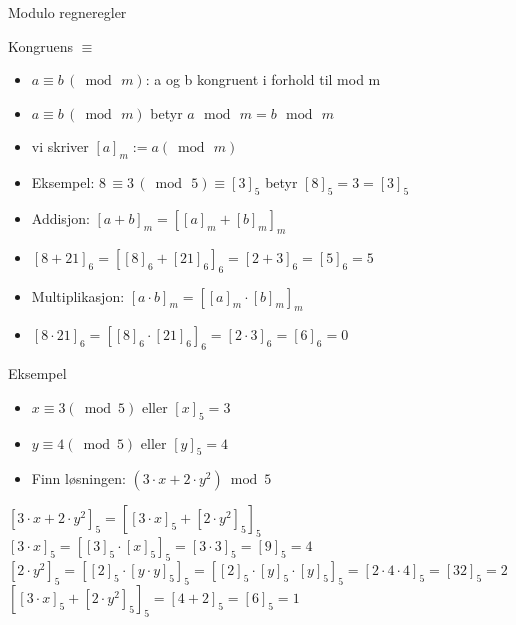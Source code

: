 \begin{frame}{Modulo regneregler}
       \begin{block}{Kongruens $\equiv$}
              \begin{itemize}
                     \item $a \equiv b\, (\bmod \, m)$: a og b kongruent i forhold til mod m
                     \item $a \equiv b\, (\bmod\, m)$ betyr $a\, \bmod\, m=b\, \bmod\, m$
                     \item vi skriver $[a]_m := a (\bmod\, m)$
                     \item Eksempel: $8\, \equiv 3\, (\bmod\, 5) \equiv [3]_5$ betyr $[8]_5=3=[3]_5$ 
              \end{itemize}
       \end{block}
       \pause
       \begin{itemize}[<+->]
              \item Addisjon: $[a+b]_m = [[a]_m + [b]_m]_m$
\item $[8+21]_6 = [[8]_6 + [21]_6]_6 = [2 + 3]_6 = [5]_6 = 5$
\item Multiplikasjon: $[a\cdot b]_m = [[a]_m \cdot [b]_m]_m$
\item $[8 \cdot 21]_6 = [[8]_6 \cdot [21]_6]_6 = [2 \cdot 3]_6 = [6]_6 = 0$
\end{itemize}
\end{frame}

\begin{frame}{}
\begin{exampleblock}{Eksempel}
\begin{itemize}
\item $x \equiv 3(\bmod 5)$ eller $[x]_5=3$
\item $y \equiv 4(\bmod 5)$ eller $[y]_5=4$
\item Finn løsningen: $(3 \cdot x+2 \cdot y^2) \bmod 5$
\end{itemize}
\end{exampleblock}
\pause
\medskip

$[3\cdot x+2\cdot y^2]_5=[[3\cdot x]_5+[2\cdot y^2]_5]_5$\\

$[3\cdot x]_5=[[3]_5\cdot [x]_5]_5=[3\cdot 3]_5=[9]_5=4$\\
$[2\cdot y^2]_5=[[2]_5\cdot [y\cdot y]_5]_5=[[2]_5\cdot [y]_5\cdot[y]_5]_5=[2\cdot 4\cdot 4]_5=[32]_5=2$\\

$[[3\cdot x]_5+[2\cdot y^2]_5]_5=[4+2]_5=[6]_5=1$
\end{frame}

